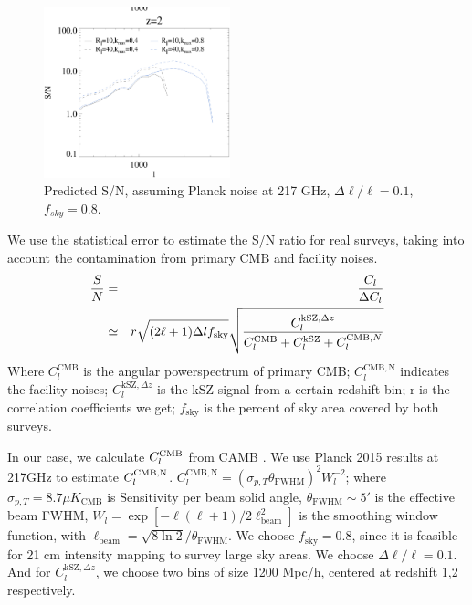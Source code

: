 \begin{figure}[tbp]
\begin{center}
\includegraphics[width=0.48\textwidth]{figure/sn_z1_z2.eps}
\end{center}
\vspace{-0.7cm}
\caption{Predicted S/N, assuming Planck noise at 217 GHz, $\Delta \ell/\ell=0.1$, $f_{sky}=0.8$. 
}
\label{fig:sn}
\end{figure}
We use the statistical error to estimate the S/N ratio for real surveys, 
taking into account the contamination from primary CMB and facility noises.
\begin{eqnarray}
    \frac{S}{N}&=&\frac{C_l}{\Delta C_l}\\\nonumber
               &\simeq&
    r\sqrt{(2\ell+1)\Delta l f_\mathrm{sky}}\sqrt{\frac{C_l^{\mathrm{kSZ},\Delta z}}{C_l^{\mathrm{CMB}}+C_l^\mathrm{kSZ}+C_l^{\mathrm{CMB},N}}}
\end{eqnarray}
Where $C_l^\mathrm{CMB}$ is the angular powerspectrum of primary CMB; 
$C_l^\mathrm{CMB,N}$ indicates the facility noises; 
$C_l^{\mathrm{kSZ},\Delta z}$ is the kSZ signal from a certain redshift bin; 
r is the correlation coefficients we get; 
$f_\mathrm{sky}$ is the percent of sky area covered by both surveys.

In our case, we calculate $C_l^\mathrm{CMB}$ from CAMB \cite{CAMB}. 
We use Planck 2015 results \cite{Planck2015} at 217GHz to estimate $C_l^\mathrm{CMB,N}$.
$C_l^\mathrm{CMB,N}=(\sigma_{p,T}\theta_\mathrm{FWHM})^2W_l^{-2}$;  
where $\sigma_{p,T}=8.7\mu K_\mathrm{CMB}$ is Sensitivity per beam solid angle, 
$\theta_\mathrm{FWHM}\sim 5'$ is the effective beam FWHM, 
$W_l=\exp[-\ell(\ell+1)/2\ell^2_\mathrm{beam}]$ is the smoothing window function, 
with $\ell _\mathrm{beam}=\sqrt{8\ln2}/\theta_\mathrm{FWHM}$. 
We choose $f_\mathrm{sky}=0.8$, since it is feasible for 21 cm intensity mapping to survey large sky areas. 
We choose $\Delta \ell/\ell=0.1$. 
And for $C_l^{\mathrm{kSZ},\Delta z}$, we choose two bins of size 1200 Mpc/h, centered at redshift 1,2 respectively.


